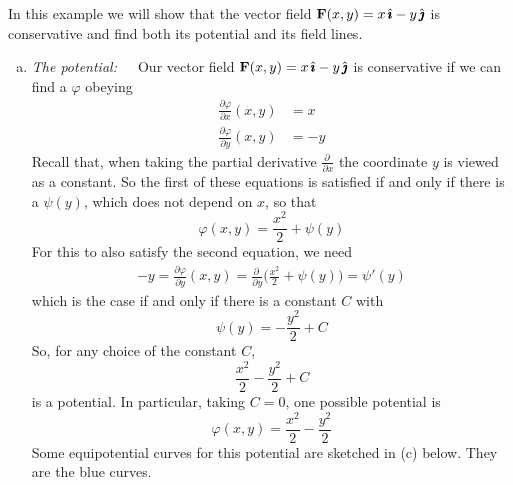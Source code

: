 \begin{eg}\label{eg:fieldlinesPotential}
In this example we will show that the vector field $\mathbf{F}(x,y) = x\,\hat{\pmb{\imath}}-y\,\hat{\pmb{\jmath}}$
is conservative and find both its potential and its field lines.
\begin{enumerate}[(a)]
\item \emph{The potential:}\ \ \ Our vector field $\mathbf{F}(x,y) = x\,\hat{\pmb{\imath}}-y\,\hat{\pmb{\jmath}}$
is conservative if we can find a $\varphi$ obeying
\begin{align*}
\frac{\partial \varphi}{\partial x}(x,y) &= x \\
\frac{\partial \varphi}{\partial y}(x,y) &= -y 
\end{align*}
Recall that, when taking the partial derivative $\frac{\partial\ }{\partial x}$
the coordinate $y$ is viewed as a constant. So the first of these equations
is satisfied if and only if there is a $\psi(y)$, which does not depend on $x$,
so that 
\begin{equation*}
\varphi(x,y) = \frac{x^2}{2} +\psi(y)
\end{equation*}
For this to also satisfy the second equation, we need
\begin{align*}
-y=\frac{\partial \varphi}{\partial y}(x,y)
=\frac{\partial\ }{\partial y}\Big(\frac{x^2}{2} +\psi(y)\Big)
=\psi'(y)
\end{align*}
which is the case if and only if there is a constant $C$ with
\begin{equation*}
\psi(y) =-\frac{y^2}{2} +C
\end{equation*}
So, for any choice of the constant $C$,
\begin{equation*}
\frac{x^2}{2} - \frac{y^2}{2} +C
\end{equation*}
is a potential. In particular, taking $C=0$, one possible potential is 
\begin{equation*}
\varphi(x,y) = \frac{x^2}{2} - \frac{y^2}{2}
\end{equation*}
Some equipotential curves for this potential are sketched in (c) below. 
They are the blue curves.


\end{enumerate}
\end{eg}
